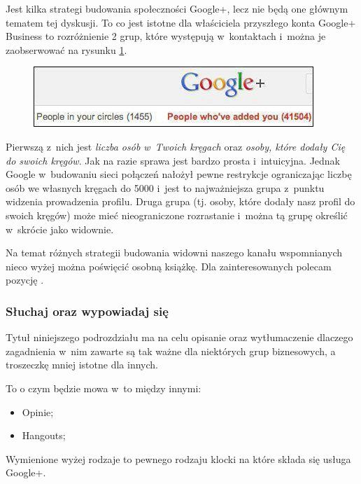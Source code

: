 Jest kilka strategi budowania społeczności Google+, lecz nie będą one głównym tematem tej dyskusji. To co jest istotne dla właściciela przyszłego konta Google+ Business to rozróżnienie 2 grup, które występują w~kontaktach i~można je zaobserwować na rysunku \ref{fig:size-of-audience-in-google-plus-circles}. 

\begin{figure}[!h]
\centering
    \scalebox{0.7}
    {
        \includegraphics{images/size-of-audience-in-google-plus-circles.png}
    }
    \label{fig:size-of-audience-in-google-plus-circles}
\end{figure}

Pierwszą z~nich jest \emph{liczba osób w~Twoich kręgach} oraz \emph{osoby, które dodały Cię do swoich kręgów}. Jak na razie sprawa jest bardzo prosta i~intuicyjna. Jednak Google w~budowaniu sieci połączeń nałożył pewne restrykcje ograniczając liczbę osób we własnych kręgach do 5000 i~jest to najważniejsza grupa z~punktu widzenia prowadzenia profilu. Druga grupa (tj. osoby, które  dodały nasz profil do swoich kręgów) może mieć nieograniczone rozrastanie i~można tą grupę określić w~skrócie jako widownie. 

Na temat różnych strategii budowania widowni naszego kanału wspomnianych nieco wyżej można poświęcić osobną książkę. Dla zainteresowanych polecam pozycję \cite{Brogan12}.


\subsubsection{Słuchaj oraz wypowiadaj się}
Tytuł niniejszego podrozdziału ma na celu opisanie oraz wytłumaczenie dlaczego zagadnienia w~nim zawarte są tak ważne dla niektórych grup biznesowych, a troszeczkę mniej istotne dla innych.

To o czym będzie mowa w~to między innymi:

\begin{itemize}
\item Opinie;
\item Hangouts;
\end{itemize}

Wymienione wyżej rodzaje to pewnego rodzaju klocki na które składa się usługa Google+. 

